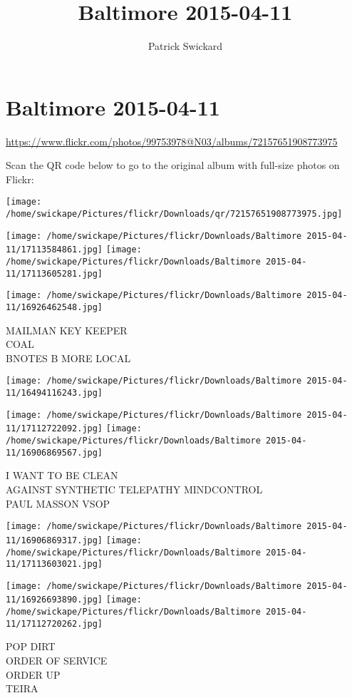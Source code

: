 \documentclass[10pt,letterpaper]{article}
\title{Baltimore 2015-04-11}
\author{Patrick Swickard}
\date{}
\begin{document}
\section*{Baltimore 2015-04-11}

\url{https://www.flickr.com/photos/99753978@N03/albums/72157651908773975}

Scan the QR code below to go to the original album with full-size photos on Flickr:

\texttt{[image: /home/swickape/Pictures/flickr/Downloads/qr/72157651908773975.jpg]}
\pagebreak

\texttt{[image: /home/swickape/Pictures/flickr/Downloads/Baltimore 2015-04-11/17113584861.jpg]}
\texttt{[image: /home/swickape/Pictures/flickr/Downloads/Baltimore 2015-04-11/17113605281.jpg]}

\texttt{[image: /home/swickape/Pictures/flickr/Downloads/Baltimore 2015-04-11/16926462548.jpg]}

MAILMAN KEY KEEPER\\
COAL\\
BNOTES B MORE LOCAL
\pagebreak

\texttt{[image: /home/swickape/Pictures/flickr/Downloads/Baltimore 2015-04-11/16494116243.jpg]}

\vspace{0.25in}
\texttt{[image: /home/swickape/Pictures/flickr/Downloads/Baltimore 2015-04-11/17112722092.jpg]}
\texttt{[image: /home/swickape/Pictures/flickr/Downloads/Baltimore 2015-04-11/16906869567.jpg]}

I WANT TO BE CLEAN\\
AGAINST SYNTHETIC TELEPATHY MINDCONTROL\\
PAUL MASSON VSOP
\pagebreak

\texttt{[image: /home/swickape/Pictures/flickr/Downloads/Baltimore 2015-04-11/16906869317.jpg]}
\texttt{[image: /home/swickape/Pictures/flickr/Downloads/Baltimore 2015-04-11/17113603021.jpg]}

\texttt{[image: /home/swickape/Pictures/flickr/Downloads/Baltimore 2015-04-11/16926693890.jpg]}
\texttt{[image: /home/swickape/Pictures/flickr/Downloads/Baltimore 2015-04-11/17112720262.jpg]}

POP DIRT\\
ORDER OF SERVICE\\
ORDER UP\\
TEIRA
\pagebreak
\end{document}
